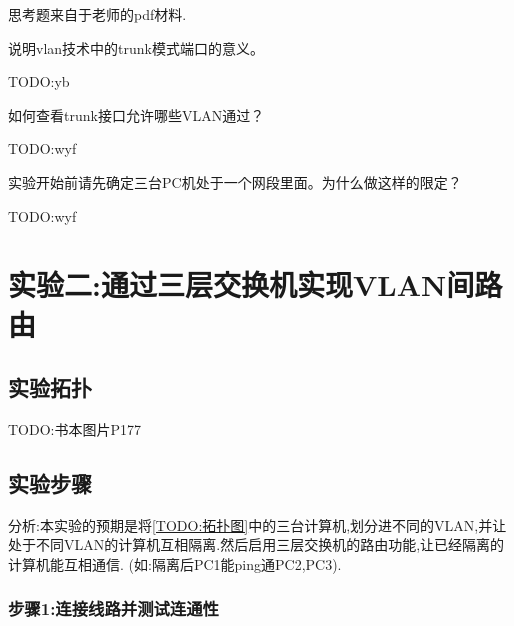 \documentclass{myreport}
\begin{document}
思考题来自于老师的pdf材料.

\begin{tcolorbox}[title = {思考题一}]
说明vlan技术中的trunk模式端口的意义。
\end{tcolorbox}

TODO:yb

\begin{tcolorbox}[title = {思考题二}]
如何查看trunk接口允许哪些VLAN通过？
\end{tcolorbox}
TODO:wyf

\begin{tcolorbox}[title = {思考题三}]
实验开始前请先确定三台PC机处于一个网段里面。为什么做这样的限定？
\end{tcolorbox}
TODO:wyf


\chapter{实验二:通过三层交换机实现VLAN间路由}

\section{实验拓扑}

TODO:书本图片P177

\section{实验步骤}

分析:本实验的预期是将\autoref{TODO:拓扑图}中的三台计算机,划分进不同的VLAN,并让处于不同VLAN的计算机互相隔离.然后启用三层交换机的路由功能,让已经隔离的计算机能互相通信.
(如:隔离后PC1能ping通PC2,PC3).

\subsection{步骤1:连接线路并测试连通性}
\end{document}
